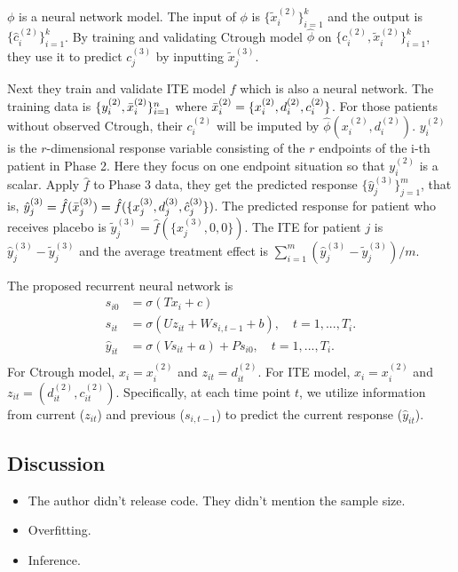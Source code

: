 \documentclass[12pt]{article}
\begin{document}
$\phi$ is a neural network model. The input of $\phi$ is
$\{\tilde{x}^{(2)}_i\}_{i=1}^{k}$ and the output is
$\{\hat{c}^{(2)}_i\}_{i=1}^{k}$. By training and validating Ctrough model
$\hat{\phi}$ on $\{c^{(2)}_i, \tilde{x}^{(2)}_i\}_{i=1}^{k}$, they use
it to predict $c^{(3)}_j$ by inputting $\tilde{x}^{(3)}_j$.

Next they train and validate ITE model $f$ which is also a neural
network. The training data is $\{y^{(2)}_i,
\Bar{x}^{(2)}_i\}_{i=1}^{n}$ where $\Bar{x}^{(2)}_i = \{x^{(2)}_i,
d^{(2)}_i, c^{(2)}_i\}$. For those patients without observed Ctrough,
their $c^{(2)}_i$ will be imputed by $\hat{\phi}(x^{(2)}_i,
d^{(2)}_i)$. $y^{(2)}_i$ is the $r$-dimensional response variable
consisting of the $r$ endpoints of the i-th patient in Phase 2. Here
they focus on one endpoint situation so that $y^{(2)}_i$ is a
scalar. Apply $\hat{f}$ to Phase 3 data, they get the predicted
response $\{\hat{y}^{(3)}_j\}_{j=1}^{m}$, that is, $\hat{y}^{(3)}_j =
\hat{f}(\Bar{x}^{(3)}_j) = \hat{f}(\{x^{(3)}_j, d^{(3)}_j,
\hat{c}^{(3)}_j\})$. The predicted response for patient who receives
placebo is $\tilde{y}^{(3)}_j = \hat{f}(\{x^{(3)}_j, 0, 0\})$. The ITE
for patient $j$ is $\hat{y}^{(3)}_j - \tilde{y}^{(3)}_j$ and the
average treatment effect is $\sum_{i=1}^{m}(\hat{y}^{(3)}_j -
\tilde{y}^{(3)}_j)/m$.

The proposed recurrent neural network is
\begin{align*}
  s_{i0} &= \sigma(T x_i + c) \\
  s_{it} &= \sigma(U
           z_{it} + W s_{i,t-1} + b), \quad t=1,...,T_i. \\
  \hat{y}_{it} &=
                 \sigma(V s_{it} + a) + P s_{i0}, \quad t=1,...,T_i.\\
\end{align*}
For Ctrough model, $x_i = x^{(2)}_i$ and $z_{it} =
d^{(2)}_{it}$. For ITE model, $x_i = x^{(2)}_i$ and $z_{it} =
(d^{(2)}_{it}, c^{(2)}_{it})$. Specifically, at each time point $t$,
we utilize information from current ($z_{it}$) and previous
($s_{i,t-1}$) to predict the current response ($\hat{y}_{it}$).

\subsection{Discussion}

\begin{itemize}
  \item The author didn't release code. They didn't mention the sample size.
  \item Overfitting.
  \item Inference.
\end{itemize}
\end{document}
